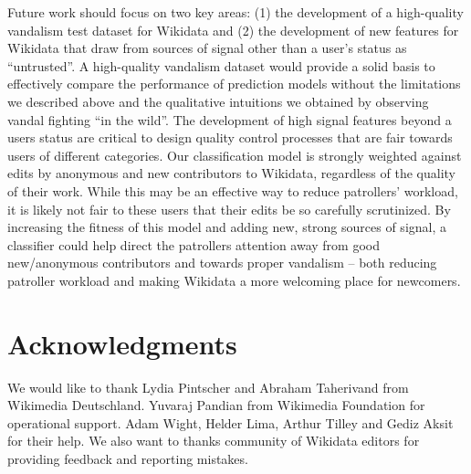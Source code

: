 \documentclass{sig-alternate-2013}
\begin{document}
Future work should focus on two key areas: (1) the development of a high-quality vandalism test dataset for Wikidata and (2) the development of new features for Wikidata that draw from sources of signal other than a user's status as ``untrusted''. A high-quality vandalism dataset would provide a solid basis to effectively compare the performance of prediction models without the limitations we described above and the qualitative intuitions we obtained by observing vandal fighting ``in the wild''. The development of high signal features beyond a users status are critical to design quality control processes that are fair towards users of different categories. Our classification model is strongly weighted against edits by anonymous and new contributors to Wikidata, regardless of the quality of their work.  While this may be an effective way to reduce patrollers' workload, it is likely not fair to these users that their edits be so carefully scrutinized. By increasing the fitness of this model and adding new, strong sources of signal, a classifier could help direct the patrollers attention away from good new/anonymous contributors and towards proper vandalism -- both reducing patroller workload and making Wikidata a more welcoming place for newcomers.
\section{Acknowledgments}
We would like to thank Lydia Pintscher and Abraham Taherivand from Wikimedia Deutschland. Yuvaraj Pandian from Wikimedia Foundation for operational support. Adam Wight, Helder Lima, Arthur Tilley and Gediz Aksit for their help. We also want to thanks community of Wikidata editors for providing feedback and reporting mistakes.


\end{document}
